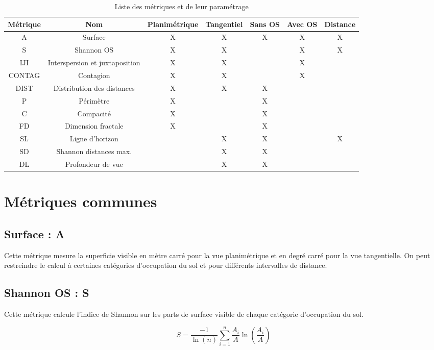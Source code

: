 \documentclass{report}
\begin{document}
\begin{table}[H]
	\begin{tabular}{|c|c|c|c|c|c|c|}
		\hline
		Métrique & Nom & Planimétrique & Tangentiel & Sans OS & Avec OS & Distance\\
		\hline
		A & Surface & X & X & X & X & X\\
		\hline
		S & Shannon OS & X & X &  & X & X\\
		\hline
		IJI & Interspersion et juxtaposition & X & X &  & X & \\
		\hline
		CONTAG & Contagion & X & X &  & X & \\
		\hline
		DIST & Distribution des distances & X & X & X &  & \\
		\hline
		P & Périmètre & X &  & X &  & \\
		\hline
		C & Compacité & X &  & X &  & \\
		\hline
		FD & Dimension fractale & X &  & X &  & \\
		\hline
		SL & Ligne d'horizon &  & X & X &  & X \\
		\hline
		SD & Shannon distances max. &  & X & X &  & \\
		\hline
		DL & Profondeur de vue &  & X & X &  & \\		
		\hline
	\end{tabular}
	\caption{Liste des métriques et de leur paramétrage}
	\label{metrics_tab}
\end{table}

\section{Métriques communes}

\subsection{Surface : A}
Cette métrique mesure la superficie visible en mètre carré pour la vue planimétrique et en degré carré pour la vue tangentielle. On peut restreindre le calcul à certaines catégories d'occupation du sol et pour différents intervalles de distance.


\subsection{Shannon OS : S}
Cette métrique calcule l'indice de Shannon sur les parts de surface visible de chaque catégorie d'occupation du sol.

$$S = \frac{-1}{\ln(n)}\sum_{i=1}^{n}\frac{A_i}{A}\ln\left(\frac{A_i}{A}\right)$$
\end{document}
